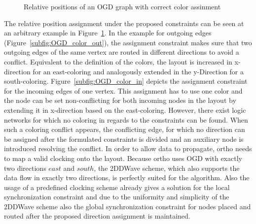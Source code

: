 \begin{figure}
	\centering
	 \qquad
	
	\caption{Relative positions of an OGD graph with correct color assinment}\label{fig:OGD_color}
\end{figure}

The relative position assignment under the proposed constraints can be seen at an arbitrary example in Figure~\ref{fig:OGD_color}. In the example for outgoing edges (Figure~\ref{subfig:OGD_color_out}), the assignment constraint makes sure that two outgoing edges of the same vertex are routed in different directions to avoid a conflict. Equivalent to the definition of the colors, the layout is increased in x-direction for an east-coloring and analogously extended in the y-Direction for a south-coloring. Figure~\ref{subfig:OGD_color_in} depicts the assignment constraint for the incoming edges of one vertex. This assignment has to use one color and the node can be set non-conflicting for both incoming nodes in the layout by extending it in x-direction based on the east-coloring. However, there exist logic networks for which no coloring in regards to the constraints can be found. When such a coloring conflict appears, the conflicting edge, for which no direction can be assigned after the formulated constraints is divided and an auxiliary node is introduced resolving the conflict.
In order to allow data to propagate, ortho needs to map a valid clocking onto the layout. 
Because ortho uses OGD with exactly two directions $east$ and $south$, the 2DDWave scheme, which also supports the data flow in exactly two directions, is perfectly suited for the algorithm. Also the usage of a predefined clocking scheme already gives a solution for the local synchronization constraint and due to the uniformity and simplicity of the 2DDWave scheme also the global synchronization constraint for nodes placed and routed after the proposed direction assignment is maintained.

